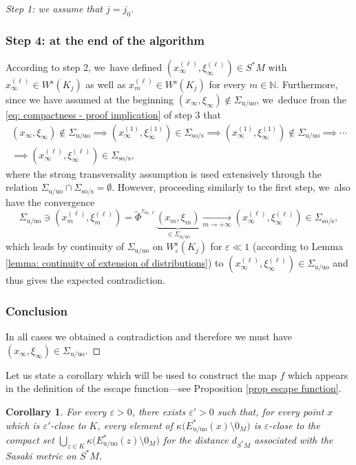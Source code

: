 \documentclass[11pt]{article}
\newcommand{\rs}{\mathrm{s}}
\newcommand{\rso}{\mathrm{so}}
\newcommand{\ru}{\mathrm{u}}
\newcommand{\ruo}{\mathrm{uo}}
\theoremstyle{definition}
\theoremstyle{plain}
\newtheorem{corollary}[definition]{Corollary}
\newcommand{\N}{\mathbb{N}}
\begin{document}
\begin{proof}[Step 1: we assume that $j = j_0$]
\subsubsection*{Step 4: at the end of the algorithm}
According to step 2, we~have defined $(x_{\infty}^{(\ell)}, \xi_{\infty}^{(\ell)}) \in S^*M$ with $x_{\infty}^{(\ell)} \in W^\rs (K_j)$ as well as $x_{m}^{(\ell)} \in W^\rs (K_j)$ for every $m \in \N$. Furthermore, since we have assumed at the beginning $(x_{\infty},\xi_{\infty}) \notin \Sigma_{\ru/\ruo}$, we~deduce from the \eqref{eq: compactness - proof implication} of step 3 that\vspace*{-5pt}
\begin{multline*}
(x_{\infty},\xi_{\infty}) \notin \Sigma_{\ru/\ruo} \implies (x_{\infty}^{(1)}, \xi_{\infty}^{(1)}) \in \Sigma_{\rso/\rs} \implies (x_{\infty}^{(1)}, \xi_{\infty}^{(1)}) \notin \Sigma_{\ru/\ruo} \implies \cdots \\
\implies (x_{\infty}^{(\ell)}, \xi_{\infty}^{(\ell)}) \in \Sigma_{\rso/\rs},
\end{multline*}
where the strong transversality assumption is used extensively through the relation $\Sigma_{\ru/\ruo} \cap \Sigma_{\rso/\rs} = \emptyset$. However, proceeding similarly to the first step, we~also have the convergence\vspace*{-3pt}\enlargethispage{.5\baselineskip}
\[
\Sigma_{\ru/\ruo} \ni (x_m^{(\ell)},\xi_m^{(\ell)}) = \widetilde{\Phi}^{\tau_{m,\ell}} \underbrace{(x_m,\xi_m)}_{\in \Sigma_{\ru/\ruo}} \underset{m \to +\infty}{\to} (x_{\infty}^{(\ell)}, \xi_{\infty}^{(\ell)}) \in \Sigma_{\rso/\rs},
\]
which leads by continuity of $\Sigma_{\ru/\ruo}$ on $W_{\varepsilon}^\rs (K_j)$ for $\varepsilon \ll 1$ (according to Lemma \ref{lemma: continuity of extension of distributions}) to $(x_{\infty}^{(\ell)}, \xi_{\infty}^{(\ell)}) \in \Sigma_{\ru/\ruo}$ and thus gives the expected contradiction.

\subsubsection*{Conclusion}
In all cases we obtained a contradiction and therefore we must have $(x_{\infty},\xi_{\infty}) \in \Sigma_{\ru/\ruo}$.
\end{proof}

Let us state a corollary which will be used to construct the map $f$ which appears in the definition of the escape function---see Proposition \ref{prop escape function}.

\begin{corollary}\label{Corollary compactness proposition}
For every $\varepsilon > 0$, there exists $\varepsilon' > 0$ such that, for every point $x$ which is $\varepsilon'$-close to $K$, every element of $\kappa \bigl(E_{\ru/\ruo}^* (x) \setminus 0_M\bigr)$ is $\varepsilon$-close to the compact set $\bigcup_{z \in K} \kappa\bigl(E_{\ru/\ruo}^* (z)\setminus 0_M \bigr)$ for the distance $d_{S^*M}$ associated with the Sasaki metric on $S^*M$.
\end{corollary}
\end{document}
